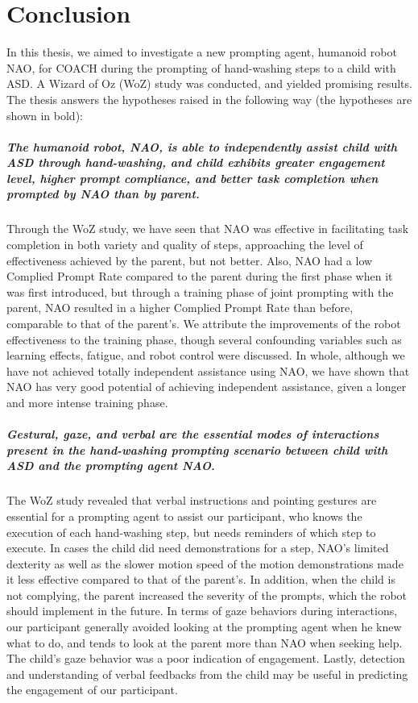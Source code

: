 \chapter{Conclusion}
In this thesis, we aimed to investigate a new prompting agent, humanoid robot NAO, for COACH during the prompting of hand-washing steps to a child with ASD.  A Wizard of Oz (WoZ) study was conducted, and yielded promising results.
The thesis answers the hypotheses raised in the following way (the hypotheses are shown in bold):

\paragraph{The humanoid robot, NAO, is able to independently assist child with ASD through hand-washing, and child exhibits greater engagement level, higher prompt compliance, and better task completion when prompted by NAO than by parent.}
Through the WoZ study, we have seen that NAO was effective in facilitating task completion in both variety and quality of steps, approaching the level of effectiveness achieved by the parent, but not better.  Also, NAO had a low Complied Prompt Rate compared to the parent during the first phase when it was first introduced, but through a training phase of joint prompting with the parent, NAO resulted in a higher Complied Prompt Rate than before, comparable to that of the parent's.  We attribute the improvements of the robot effectiveness to the training phase, though several confounding variables such as learning effects, fatigue, and robot control were discussed.  In whole, although we have not achieved totally independent assistance using NAO, we have shown that NAO has very good potential of achieving independent assistance, given a longer and more intense training phase.

\paragraph{Gestural, gaze, and verbal are the essential modes of interactions present in the hand-washing prompting scenario between child with ASD and the prompting agent NAO.}
The WoZ study revealed that verbal instructions and pointing gestures are essential for a prompting agent to assist our participant, who knows the execution of each hand-washing step, but needs reminders of which step to execute.  In cases the child did need demonstrations for a step, NAO's limited dexterity as well as the slower motion speed of the motion demonstrations made it less effective compared to that of the parent's.  In addition, when the child is not complying, the parent increased the severity of the prompts, which the robot should implement in the future.  In terms of gaze behaviors during interactions, our participant generally avoided looking at the prompting agent when he knew what to do, and tends to look at the parent more than NAO when seeking help.  The child's gaze behavior was a poor indication of engagement.  Lastly, detection and understanding of verbal feedbacks from the child may be useful in predicting the engagement of our participant.

